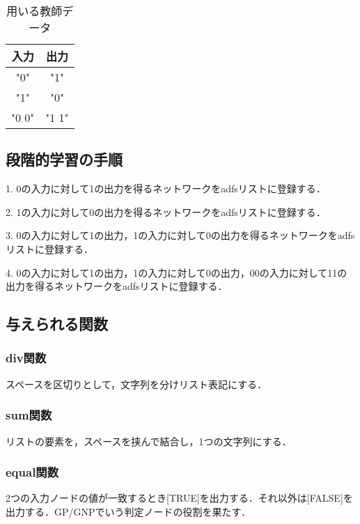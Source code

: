 \documentclass[exploratorypaper]{jsaiart} %
\begin{document}
\begin{table}[htbp]
\centering
\caption{用いる教師データ}
\label{tbl:result}
\begin{tabular}{cc}
    \hline
     入力 & 出力 \\
    \hline
    "0" & "1" \\
    "1" & "0" \\
    "0 0" & "1 1" \\
    \hline
\end{tabular}
\end{table}

\subsection{段階的学習の手順}
1. 0の入力に対して1の出力を得るネットワークをadfsリストに登録する．

2. 1の入力に対して0の出力を得るネットワークをadfsリストに登録する．

3. 0の入力に対して1の出力，1の入力に対して0の出力を得るネットワークをadfsリストに登録する．

4. 0の入力に対して1の出力，1の入力に対して0の出力，00の入力に対して11の出力を得るネットワークをadfsリストに登録する．

\subsection{与えられる関数}
\subsubsection{div関数}
スペースを区切りとして，文字列を分けリスト表記にする．


\subsubsection{sum関数}
リストの要素を，スペースを挟んで結合し，1つの文字列にする．

\subsubsection{equal関数}
2つの入力ノードの値が一致するとき[TRUE]を出力する．それ以外は[FALSE]を出力する．GP/GNPでいう判定ノードの役割を果たす．
\end{document}
